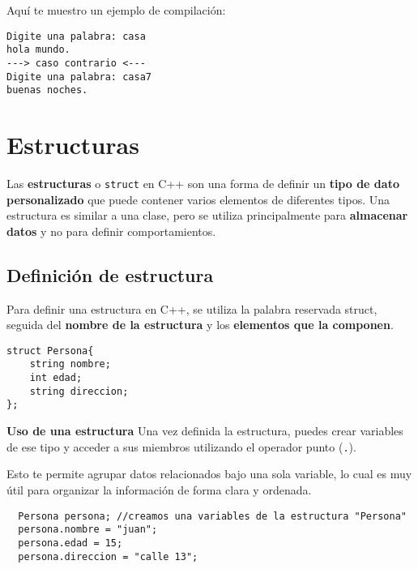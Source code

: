 \documentclass[
  11pt,
  a4paper,
  DIV=11,
  numbers=noendperiod]{scrreprt}
\begin{document}
Aquí te muestro un ejemplo de compilación:

\begin{tcolorbox}[custombox]
\begin{verbatim}
Digite una palabra: casa
hola mundo.
---> caso contrario <---
Digite una palabra: casa7
buenas noches.
\end{verbatim}
\end{tcolorbox}


\chapter{Estructuras}\label{estructuras}

Las \textbf{estructuras} o \texttt{struct} en C++ son una forma de
definir un \textbf{tipo de dato personalizado} que puede contener varios
elementos de diferentes tipos. Una estructura es similar a una clase,
pero se utiliza principalmente para \textbf{almacenar datos} y no para
definir comportamientos.

\section{Definición de estructura}\label{definiciuxf3n-de-estructura}

Para definir una estructura en C++, se utiliza la palabra reservada
struct, seguida del \textbf{nombre de la estructura} y los
\textbf{elementos que la componen}.

\begin{tcolorbox}[custombox]
\begin{verbatim}
struct Persona{
    string nombre;
    int edad;
    string direccion;
};
\end{verbatim}
\end{tcolorbox}

\textbf{Uso de una estructura} Una vez definida la estructura, puedes
crear variables de ese tipo y acceder a sus miembros utilizando el
operador punto (\texttt{.}).

Esto te permite agrupar datos relacionados bajo una sola variable, lo
cual es muy útil para organizar la información de forma clara y
ordenada.

\begin{tcolorbox}[custombox]
\begin{verbatim}
  Persona persona; //creamos una variables de la estructura "Persona"
  persona.nombre = "juan";
  persona.edad = 15;
  persona.direccion = "calle 13";
\end{verbatim}
\end{tcolorbox}
\end{document}
